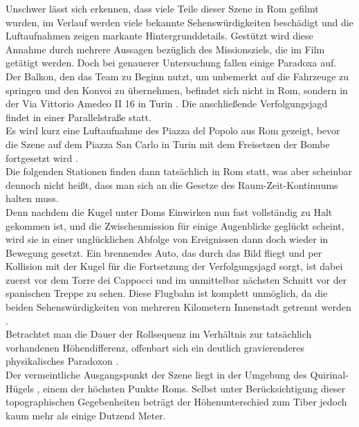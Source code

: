 Unschwer lässt sich erkennen, dass viele Teile dieser Szene in Rom gefilmt wurden, im Verlauf werden viele bekannte Sehenswürdigkeiten beschädigt und die Luftaufnahmen zeigen markante Hintergrunddetails. Gestützt wird diese Annahme durch mehrere Aussagen bezüglich des Missionsziels, die im Film getätigt werden. Doch bei genauerer Untersuchung fallen einige Paradoxa auf. 
\\
Der Balkon, den das Team zu Beginn nutzt, um unbemerkt auf die Fahrzeuge zu springen und den Konvoi zu übernehmen, befindet sich nicht in Rom, sondern in der Via Vittorio Amedeo II 16 in Turin \parencite{TurinBalconyJump}. Die anschließende Verfolgungsjagd findet in einer Parallelstraße statt\parencite{FilmLocationsTurin}.
\\
Es wird kurz eine Luftaufnahme des Piazza del Popolo aus Rom\parencite{PiazzaDelPopoloWiki} gezeigt, bevor die Szene auf dem Piazza San Carlo in Turin mit dem Freisetzen der Bombe fortgesetzt wird \parencite{PiazzaSanCarloWiki}.
\\
Die folgenden Stationen finden dann tatsächlich in Rom statt, was aber scheinbar dennoch nicht heißt, dass man sich an die Gesetze des Raum-Zeit-Kontinuums halten muss.
\\
Denn nachdem die Kugel unter Doms Einwirken nun fast vollständig zu Halt gekommen ist, und die Zwischenmission für einige Augenblicke geglückt scheint, wird sie in einer unglücklichen Abfolge von Ereignissen dann doch wieder in Bewegung gesetzt.  
Ein brennendes Auto, das durch das Bild fliegt und per Kollision mit der Kugel für die Fortsetzung der Verfolgungsjagd sorgt, ist dabei zuerst vor dem Torre dei Cappocci \parencite{TorreDeiCapocciWiki} und im unmittelbar nächsten Schnitt vor der spanischen Treppe \parencite{SpanishStepsWiki} zu sehen. Diese Flugbahn ist komplett unmöglich, da die beiden Sehenswürdigkeiten von mehreren Kilometern Innenstadt getrennt werden \parencite{imdbDistance}.
\\
Betrachtet man die Dauer der Rollsequenz im Verhältnis zur tatsächlich vorhandenen Höhendifferenz, offenbart sich ein deutlich gravierenderes physikalisches Paradoxon \parencites{imdbHeight}{topoHeightRome}.  
\\
Der vermeintliche Ausgangspunkt der Szene liegt in der Umgebung des Quirinal-Hügels \parencite{QuirinalWiki}, einem der höchsten Punkte Roms. Selbst unter Berücksichtigung dieser topographischen Gegebenheiten beträgt der Höhenunterschied zum Tiber jedoch kaum mehr als einige Dutzend Meter.  
\\
